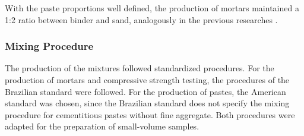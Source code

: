 With the paste proportions well defined, the production of mortars maintained a 1:2 ratio between binder and sand, analogously in the previous researches \cite{batista2025mgosio2}. 



\subsubsection{Mixing Procedure}
\label{sec:mixing_procedure}

The production of the mixtures followed standardized procedures. For the production of mortars and compressive strength testing, the procedures of the Brazilian standard \cite{ABNT_NBR_7215_2019} were followed. For the production of pastes, the American standard \cite{ASTM_C305_2006} was chosen, since the Brazilian standard does not specify the mixing procedure for cementitious pastes without fine aggregate. Both procedures were adapted for the preparation of small-volume samples.

